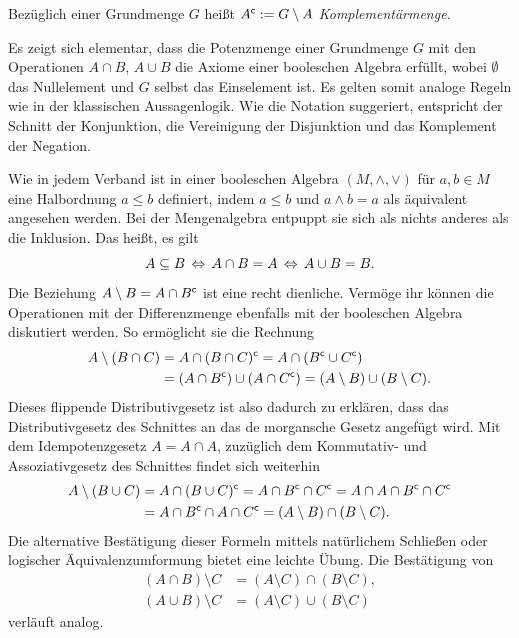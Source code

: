 \begin{Definition}[Komplement]%
\newlinefirst
Bezüglich einer Grundmenge $G$ heißt $A^\mathsf c := G\setminus A$
\emph{Komplementärmenge}.
\end{Definition}
Es zeigt sich elementar, dass die Potenzmenge einer Grundmenge $G$
mit den Operationen $A\cap B$, $A\cup B$ die Axiome
einer booleschen Algebra erfüllt, wobei
$\emptyset$ das Nullelement und $G$ selbst das Einselement ist. Es
gelten somit analoge Regeln wie in der klassischen Aussagenlogik. Wie
die Notation suggeriert, entspricht der Schnitt der Konjunktion, die
Vereinigung der Disjunktion und das Komplement der Negation.

Wie in jedem Verband ist in einer booleschen Algebra
$(M,\wedge,\vee)$ für $a,b\in M$ eine Halbordnung $a\le b$
definiert, indem $a\le b$ und $a\wedge b = a$ als äquivalent
angesehen werden. Bei der Mengenalgebra entpuppt sie sich
als nichts anderes als die Inklusion. Das heißt, es gilt%
\[A\subseteq B\,\Leftrightarrow\, A\cap B = A\,\Leftrightarrow\, A\cup B = B.\]
Die Beziehung $A\setminus B = A\cap B^\mathsf c$ ist eine recht dienliche.
Vermöge ihr können die Operationen mit der Differenzmenge ebenfalls mit
der booleschen Algebra diskutiert werden. So ermöglicht sie
die Rechnung
\begin{align*}
A\setminus (B\cap C) &= A\cap (B\cap C)^\mathsf c
= A\cap (B^\mathsf c\cup C^\mathsf c)\\
&= (A\cap B^\mathsf c)\cup (A\cap C^\mathsf c)
= (A\setminus B)\cup (B\setminus C).
\end{align*}
Dieses flippende Distributivgesetz ist also dadurch zu erklären,
dass das Distributivgesetz des Schnittes an das de morgansche Gesetz
angefügt wird. Mit dem Idempotenzgesetz $A=A\cap A$, zuzüglich
dem Kommutativ- und Assoziativgesetz des Schnittes findet sich weiterhin
\begin{align*}
A\setminus (B\cup C) &= A\cap (B\cup C)^\mathsf c
= A\cap B^\mathsf c\cap C^\mathsf c = A\cap A\cap B^\mathsf c\cap C^\mathsf c\\
&= A\cap B^\mathsf c\cap A\cap C^\mathsf c
= (A\setminus B)\cap (B\setminus C).
\end{align*}
Die alternative Bestätigung dieser Formeln mittels natürlichem Schließen
oder logischer Äquivalenzumformung bietet eine leichte Übung.
Die Bestätigung von
\begin{align*}
(A\cap B)\setminus C &= (A\setminus C)\cap (B\setminus C),\\
(A\cup B)\setminus C &= (A\setminus C)\cup (B\setminus C)
\end{align*}
verläuft analog.

